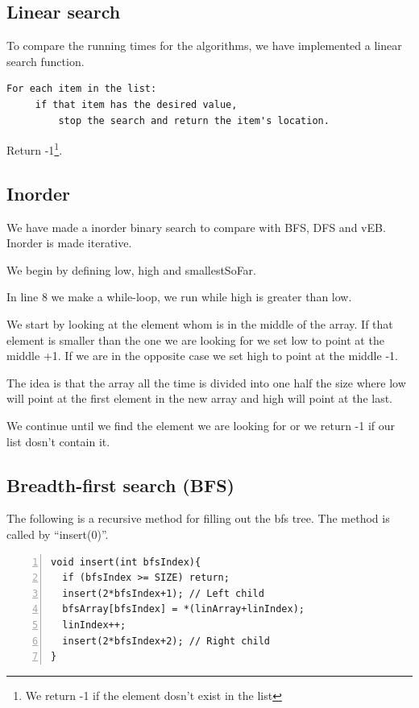 \subsection{Linear search}
To compare the running times for the algorithms, we have implemented a linear search function.
\begin{verbatim}
For each item in the list:
     if that item has the desired value,
         stop the search and return the item's location.
\end{verbatim}
 Return -1\footnote{We return -1 if the element dosn't exist in the list}.

\subsection{Inorder}

We have made a inorder binary search to compare with BFS, DFS and vEB.
Inorder is made iterative.

We begin by defining low, high and smallestSoFar.

In line 8 we make a while-loop, we run while high is greater than low.

We start by looking at the element whom is in the middle of the array.
If that element is smaller than the one we are looking for we set low to point at the middle +1.
If we are in the opposite case we set high to point at the middle -1.

The idea is that the array all the time is divided into one half the size where low will point at the first element in the new array and high will point at the last.

We continue until we find the element we are looking for or we return -1 if our list dosn't contain it.


\subsection{Breadth-first search (BFS)}
The following is a recursive method for filling out the bfs tree. The method is called by ``insert(0)''.
\begin{lstlisting}[numbers=left]
void insert(int bfsIndex){
  if (bfsIndex >= SIZE) return;
  insert(2*bfsIndex+1); // Left child
  bfsArray[bfsIndex] = *(linArray+linIndex);
  linIndex++;
  insert(2*bfsIndex+2); // Right child
}
\end{lstlisting}


